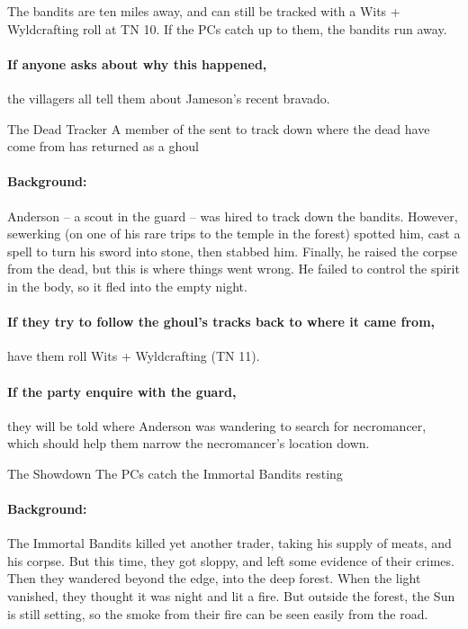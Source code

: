 \begin{multicols}{2}
The bandits are ten miles away, and can still be tracked with a Wits + Wyldcrafting roll at TN 10.
If the PCs catch up to them, the bandits run away.

\paragraph{If anyone asks about why this happened,}
the villagers all tell them about Jameson's recent bravado.

{The Dead Tracker}%
{A member of the  sent to track down where the dead have come from has returned as a ghoul}%

\paragraph{Background:}
Anderson -- a scout in the \gls{guard} -- was hired to track down the bandits.
However, \gls{sewerking} (on one of his rare trips to the temple in the forest) spotted him, cast a spell to turn his sword into stone, then stabbed him. 
Finally, he raised the corpse from the dead, but this is where things went wrong.
He failed to control the spirit in the body, so it fled into the empty night.


\paragraph{If they try to follow the ghoul's tracks back to where it came from,}
have them roll Wits + Wyldcrafting (TN 11).

\paragraph{If the party enquire with the \gls{guard},}
they will be told where Anderson was wandering to search for \gls{necromancer}, which should help them narrow the necromancer's location down.

{The Showdown}%
{The PCs catch the Immortal Bandits resting}%

\paragraph{Background:}
The Immortal Bandits killed yet another trader, taking his supply of meats, and his corpse.
But this time, they got sloppy, and left some evidence of their crimes.
Then they wandered beyond the \gls{edge}, into the deep forest.
When the light vanished, they thought it was night and lit a fire.
But outside the forest, the Sun is still setting, so the smoke from their fire can be seen easily from the road.


\end{multicols}
